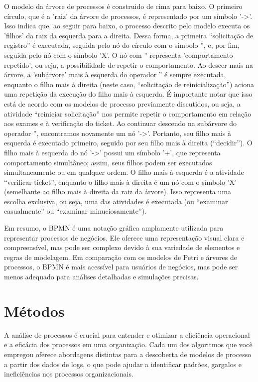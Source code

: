 \documentclass[tcc2]{classe_uftex/uftex}
\begin{document}
O modelo da árvore de processos é construido  de cima para baixo. O primeiro círculo, que é a 'raiz' da árvore de processos, é representado por um símbolo '->'. Isso indica que, ao seguir para baixo, o processo descrito pelo modelo executa os 'filhos' da raiz da esquerda para a direita. Dessa forma, a primeira “solicitação de registro” é executada, seguida pelo nó do círculo com o símbolo '', e, por fim, seguida pelo nó com o símbolo 'X'. O nó com '' representa 'comportamento repetido', ou seja, a possibilidade de repetir o comportamento. Ao descer mais na árvore, a 'subárvore' mais à esquerda do operador '' é sempre executada, enquanto o filho mais à direita (neste caso, “solicitação de reinicialização”) aciona uma repetição da execução do filho mais à esquerda. É importante notar que isso está de acordo com os modelos de processo previamente discutidos, ou seja, a atividade “reiniciar solicitação” nos permite repetir o comportamento em relação aos exames e à verificação do ticket. Ao continuar descendo na subárvore do operador '', encontramos novamente um nó '->'. Portanto, seu filho mais à esquerda é executado primeiro, seguido por seu filho mais à direita (“decidir”). O filho mais à esquerda do nó '->' possui um símbolo '+', que representa comportamento simultâneo; assim, seus filhos podem ser executados simultaneamente ou em qualquer ordem. O filho mais à esquerda é a atividade “verificar ticket”, enquanto o filho mais à direita é um nó com o símbolo 'X' (semelhante ao filho mais à direita da raiz da árvore). Isso representa uma escolha exclusiva, ou seja, uma das atividades é executada (ou “examinar casualmente” ou “examinar minuciosamente”).\cite{erdfelder2009multinomial}



Em resumo, o BPMN é uma notação gráfica amplamente utilizada para representar processos de negócios. Ele oferece uma representação visual clara e compreensível, mas pode ser complexo devido à sua variedade de elementos e regras de modelagem. Em comparação com os modelos de Petri e árvores de processos, o BPMN é mais acessível para usuários de negócios, mas pode ser menos adequado para análises detalhadas e simulações precisas.

\chapter{Métodos}

A análise de processos é crucial para entender e otimizar a eficiência operacional e a eficácia dos processos em uma organização. Cada um dos algoritmos que você empregou oferece abordagens distintas para a descoberta de modelos de processo a partir dos dados de logs, o que pode ajudar a identificar padrões, gargalos e ineficiências nos processos organizacionais. 
\end{document}
